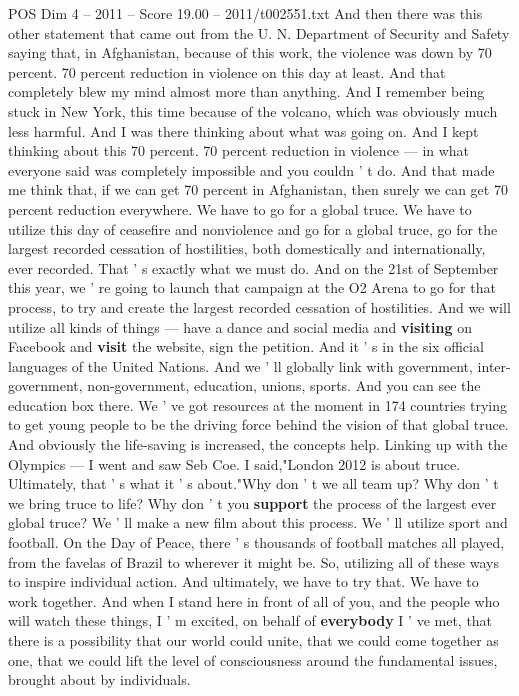 \begin{textsample}{POS Dim 4 – 2011 – Score 19.00 – 2011/t002551.txt}
And then there was this other statement that came out from the U.
N.
Department of Security and Safety saying that, in Afghanistan, because of this work, the violence was down by 70 percent. 70 percent reduction in violence on this day at least.
And that completely blew my mind almost more than anything.
And I remember being stuck in New York, this time because of the volcano, which was obviously much less harmful.
And I was there thinking about what was going on.
And I kept thinking about this 70 percent. 70 percent reduction in violence — in what everyone said was completely impossible and you couldn ' t do.
And that made me think that, if we can get 70 percent in Afghanistan, then surely we can get 70 percent reduction everywhere.
We have to go for a global truce.
We have to utilize this day of ceasefire and nonviolence and go for a global truce, go for the largest recorded cessation of hostilities, both domestically and internationally, ever recorded.
That ' s exactly what we must do.
And on the 21st of September this year, we ' re going to launch that campaign at the O2 Arena to go for that process, to try and create the largest recorded cessation of hostilities.
And we will utilize all kinds of things — have a dance and social media and \textbf{visiting} on Facebook and \textbf{visit} the website, sign the petition.
And it ' s in the six official languages of the United Nations.
And we ' ll globally link with government, inter-government, non-government, education, unions, sports.
And you can see the education box there.
We ' ve got resources at the moment in 174 countries trying to get young people to be the driving force behind the vision of that global truce.
And obviously the life-saving is increased, the concepts help.
Linking up with the Olympics — I went and saw Seb Coe.
I said,"London 2012 is about truce.
Ultimately, that ' s what it ' s about."Why don ' t we all team up?
Why don ' t we bring truce to life?
Why don ' t you \textbf{support} the process of the largest ever global truce?
We ' ll make a new film about this process.
We ' ll utilize sport and football.
On the Day of Peace, there ' s thousands of football matches all played, from the favelas of Brazil to wherever it might be.
So, utilizing all of these ways to inspire individual action.
And ultimately, we have to try that.
We have to work together.
And when I stand here in front of all of you, and the people who will watch these things, I ' m excited, on behalf of \textbf{everybody} I ' ve met, that there is a possibility that our world could unite, that we could come together as one, that we could lift the level of consciousness around the fundamental issues, brought about by individuals.

\end{textsample}
